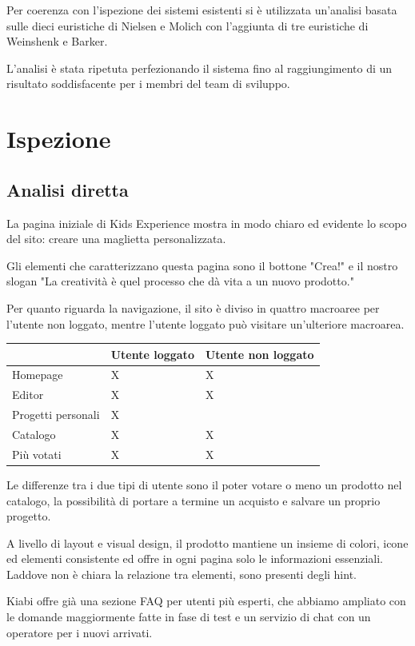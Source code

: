 \documentclass[12pt,italian,]{report}
\begin{document}
Per coerenza con l'ispezione dei sistemi esistenti si è utilizzata un'analisi basata sulle dieci euristiche di Nielsen e Molich con l'aggiunta di tre euristiche di Weinshenk e Barker.

L'analisi è stata ripetuta perfezionando il sistema fino al raggiungimento di un risultato soddisfacente per i membri del team di sviluppo.

\section{Ispezione}\label{ispezione}

\subsection{Analisi diretta}

La pagina iniziale di Kids Experience mostra in modo chiaro ed evidente lo scopo del sito: creare una maglietta personalizzata. 

Gli elementi che caratterizzano questa pagina sono il bottone "Crea!" e il nostro slogan "La creatività è quel processo che dà vita a un nuovo prodotto."

Per quanto riguarda la navigazione, il sito è diviso in quattro macroaree per l'utente non loggato, mentre l'utente loggato può visitare un'ulteriore macroarea. 

\newpage
\begin{longtable}[]{@{}lll@{}}
\toprule
& Utente loggato & Utente non loggato\tabularnewline
\midrule
\endhead
Homepage & X & X\tabularnewline
Editor & X & X\tabularnewline
Progetti personali & X &\tabularnewline
Catalogo & X & X\tabularnewline
Più votati & X & X\tabularnewline
\bottomrule
\end{longtable}

Le differenze tra i due tipi di utente sono il poter votare o meno un prodotto nel catalogo, la possibilità di portare a termine un acquisto e salvare un proprio progetto.

A livello di layout e visual design, il prodotto mantiene un insieme di colori, icone ed elementi consistente ed offre in ogni pagina solo le informazioni essenziali. Laddove non è chiara la relazione tra elementi, sono presenti degli hint.

Kiabi offre già una sezione FAQ per utenti più esperti, che abbiamo ampliato con le domande maggiormente fatte in fase di test e un servizio di chat con un operatore per i nuovi arrivati.
\end{document}
